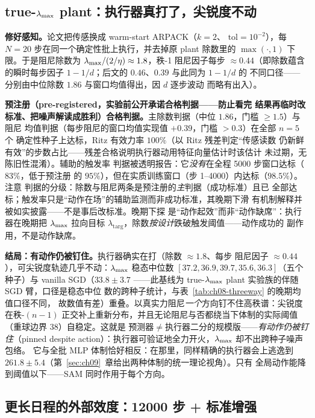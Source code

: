 \subsection{true-$\lambda_{\max}$ plant：执行器真打了，尖锐度不动}\label{sec:ch08-pinned}

\textbf{修好感知。}论文把传感换成 warm-start ARPACK（$k=2$、
$\mathrm{tol}=10^{-2}$），每 $N=20$ 步在同一个确定性批上执行，并去掉原
plant 除数里的 $\max(\cdot,1)$ 下限。于是阻尼除数为
$\lambda_{\max}/(2/\eta)\approx1.8$，秩-1 阻尼因子每步 $\approx0.44$（即除数蕴含
的瞬时每步因子 $1-1/d$；后文的 $0.46$、$0.39$ 与此同为 $1-1/d$ 的
不同口径——分别由中位除数 $1.86$ 与窗口均值得出，因 $d$ 逐步波动
而略有出入）。

\textbf{预注册（pre-registered，实验前公开承诺合格判据——防止看完
结果再临时改标准、把噪声解读成胜利）合格判据。}主除数判据（中位 $1.86$，门槛 $\ge1.5$）与阻尼
均值判据（每步阻尼的窗口均值实现值 $+0.39$，门槛 $>0.3$）在全部 $n=5$ 个
确定性种子上达标，Ritz 有效力率 $100\%$（以 Ritz 残差判定“传感读数
仍新鲜有效”的步数占比——残差合格说明执行器动用特征向量估计时该估计
未过期，无陈旧性混淆）。辅助的触发率
判据被透明报告：它\emph{没有}在全程 5000 步窗口达标（$83\%$，低于预注册
的 $95\%$），但在实质训练窗口（步 1--4000）内达标（$98.5\%$）。注意
判据的分级：除数与阻尼两条是预注册的\emph{主}判据（成功标准）且已
全部达标；触发率只是``动作在场''的辅助监测而非成功标准，其晚期下滑
有机制解释并被如实披露——不是事后改标准。晚期下探
是``动作起效''而非``动作缺席''：执行器在晚期把 $\lambda_{\max}$ 拉向目标
$\lambda_{\mathrm{targ}}$，除数\emph{按设计}跌破触发阈值——动作成功的
副作用，不是动作缺席。

\textbf{结局：有动作仍被钉住。}执行器确实在打（除数 $\approx1.8$、每步
阻尼因子 $\approx0.44$），可尖锐度轨迹几乎不动：$\lambda_{\max}$ 稳态中位数
$[37.2,36.9,39.7,35.6,36.3]$（五个种子）与 vanilla SGD（$33.8\pm3.7$
——此基线为 true-$\lambda_{\max}$ plant 实验族的伴随 SGD 臂，口径是稳态中位
数的跨种子统计，与表~\ref{tab:ch08-threeway} 的晚期均值口径不同，
故数值有差）重叠。以真实力阻尼\emph{一个}方向钉不住高秩谱：尖锐度在秩-$(n{-}1)$
正交补上重新分布，并且无论阻尼与否都绕当下体制的实际阈值（重球边界
$38$）自稳定。这就是
预测器$\ne$执行器二分的规模版——\emph{有动作仍被钉住}（pinned
despite action）：执行器可验证地全力开火，$\lambda_{\max}$ 却不出跨种子噪声包络。
它与全批 MLP 体制恰好相反：在那里，同样精确的执行器会上逃逸到
$261.8\pm5.4$（第~\ref{sec:ch09}~章给出两种体制的统一理论视角）。只有
全局动作能降到阈值以下——SAM 同时作用于每个方向。

\subsection{更长日程的外部效度：12000 步 + 标准增强}\label{sec:ch08-long}

